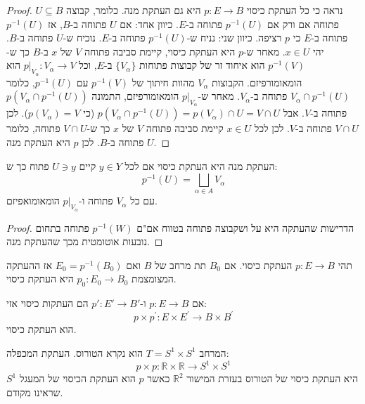 \documentclass{tstextbook}
\begin{document}
\begin{proof}
נראה כי כל העתקת כיסוי \(p:E\to B\) היא גם העתקת מנה. כלומר, קבוצה \(U\subseteq B\) פתוחה אם ורק אם \(p^{-1}(U)\) פתוחה ב-\(E\).
כיוון אחד: אם \(U\) פתוחה ב-\(B\), אז \(p^{-1}(U)\) פתוחה ב-\(E\) כי \(p\) רציפה.
כיוון שני: נניח ש-\(p^{-1}(U)\) פתוחה ב-\(E\). נוכיח ש-\(U\) פתוחה ב-\(B\). יהי \(x\in U\). מאחר ש-\(p\) היא העתקת כיסוי, קיימת סביבה פתוחה \(V\) של \(x\) ב-\(B\) כך ש-\(p^{-1}(V)\) הוא איחוד זר של קבוצות פתוחות \(\{V_\alpha\}\) ב-\(E\), וכל \(p|_{V_\alpha}:V_\alpha\to V\) הוא הומאומורפיזם.
הקבוצות \(V_\alpha\) מהוות חיתוך של \(p^{-1}(V)\) עם \(p^{-1}(U)\), כלומר \(V_\alpha\cap p^{-1}(U)\) פתוחה ב-\(V_\alpha\). מאחר ש-\(p|_{V_\alpha}\) הומאומורפיזם, התמונה \(p(V_\alpha\cap p^{-1}(U))\) פתוחה ב-\(V\). אבל \(p(V_\alpha\cap p^{-1}(U))=p(V_\alpha)\cap U=V\cap U\) (כי \(p(V_\alpha)=V\)). לכן \(V\cap U\) פתוחה ב-\(V\).
לכן לכל \(x\in U\) קיימת סביבה פתוחה \(V\) של \(x\) כך ש-\(V\cap U\) פתוחה, כלומר \(U\) פתוחה ב-\(B\).
לכן \(p\) היא העתקת מנה.

\end{proof}
\begin{proposition}
העתקת מנה היא העתקת כיסוי אם לכל \(y \in Y\) קיים \(U \ni y\) פתוח כך ש:
$$p^{-1}(U)=\bigsqcup_{\alpha\in A}V_{\alpha}$$
עם כל \(V_{\alpha}\) פתוחה ו-\(p|_{V_{\alpha}}\) הומאומואפיזם. 

\end{proposition}
\begin{proof}
הדרישות שהעתקה היא על ושקבוצה פתוחה בטווח אם"ם \(p ^{-1}(W)\) פתוחה בתחום נובעות אוטומטית מכך שהעתקת מנה.

\end{proof}
\begin{proposition}
תהי \(p:E\to B\) העתקת כיסוי. אם \(B_{0}\) תת מרחב של \(B\) ואם \(E_{0}=p ^{-1}(B_{0})\) אז ההעתקה המצומצמת \(p_{0}:E_{0}\to B_{0}\) היא העתקת כיסוי.

\end{proposition}
\begin{proposition}
אם \(p:E\to B\) ו-\(p':E'\to B'\) הם העתקות כיסוי אזי:
$$p\times p^{\prime}:E\times E^{\prime}\to B\times B^{\prime}$$
הוא העתקת כיסוי.

\end{proposition}
\begin{example}[טורוס]
המרחב \(T=S^{1}\times S^{1}\) הוא נקרא הטורוס. העתקת המכפלה:
$$p\times p:\mathbb{R}\times\mathbb{R}\longrightarrow S^{1}\times S^{1}$$
היא העתקת כיסוי של הטורוס בעזרת המישור \(\mathbb{R}^{2}\) כאשר \(p\) הוא העתקת הכיסוי של המעגל \(S^{1}\) שראינו מקודם.

\end{example}
\end{document}
